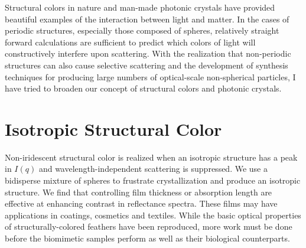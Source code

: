 Structural colors in nature and man-made photonic crystals have provided beautiful examples of the interaction between light and matter.
In the cases of periodic structures, especially those composed of spheres, relatively straight forward calculations are sufficient to predict which colors of light will constructively interfere upon scattering.
With the realization that non-periodic structures can also cause selective scattering and the development of synthesis techniques for producing large numbers of optical-scale non-spherical particles, I have tried to broaden our concept of structural colors and photonic crystals.

\section{Isotropic Structural Color}
Non-iridescent structural color is realized when an isotropic structure has a peak in $I(q)$ and wavelength-independent scattering is suppressed.
We use a bidisperse mixture of spheres to frustrate crystallization and produce an isotropic structure.
We find that controlling film thickness or absorption length are effective at enhancing contrast in reflectance spectra.
These films may have applications in coatings, cosmetics and textiles.
While the basic optical properties of structurally-colored feathers have been reproduced, more work must be done before the biomimetic samples perform as well as their biological counterparts.


